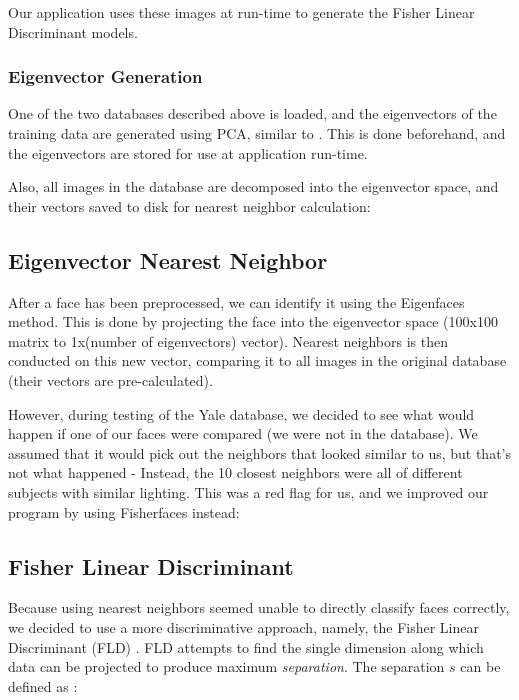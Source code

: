 Our application uses these images at run-time to generate the Fisher
Linear Discriminant models.

\subsubsection{Eigenvector Generation}

One of the two databases described above is loaded, and the
eigenvectors of the training data are generated using PCA, similar to
\cite{Eigenfaces}.  This is done beforehand, and the eigenvectors are
stored for use at application run-time.

Also, all images in the database are decomposed into the eigenvector
space, and their vectors saved to disk for nearest neighbor
calculation:

\subsection{Eigenvector Nearest Neighbor}

After a face has been preprocessed, we can identify it using the
Eigenfaces method.  This is done by projecting the face into the
eigenvector space (100x100 matrix to 1x(number of eigenvectors) vector).
Nearest neighbors is then conducted on this new vector, comparing it
to all images in the original database (their vectors are pre-calculated).

However, during testing of the Yale database, we decided to see what
would happen if one of our faces were compared (we were not in the
database).  We assumed that it would pick out the neighbors that
looked similar to us, but that's not what happened - Instead, the 10
closest neighbors were all of different subjects with similar
lighting.  This was a red flag for us, and we improved our program by
using Fisherfaces instead:

\subsection{Fisher Linear Discriminant}


Because using nearest neighbors seemed unable to directly classify
faces correctly, we decided to use a more discriminative approach,
namely, the Fisher Linear Discriminant (FLD) \cite{wikiFld}.  FLD
attempts to find the single dimension along which data can be
projected to produce maximum \emph{separation}.  The separation $s$
can be defined as \cite{wikiFld}:

